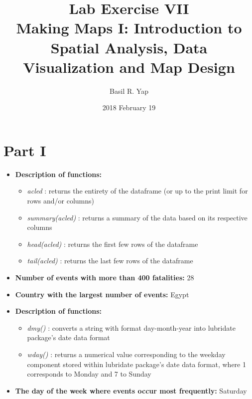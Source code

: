 \documentclass[a4paper, fleqn]{article}
\begin{document}
\title{Lab Exercise VII \\ Making Maps I: Introduction to Spatial Analysis, Data Visualization and Map Design}
\author{Basil R. Yap}
\date{2018 February 19}
\maketitle

\section{Part I}

\begin{itemize}
\item \textbf{Description of functions: }\begin{itemize}
\item \textit{acled} : returns the entirety of the dataframe (or up to the print limit for rows and/or columns)
\item \textit{summary(acled)} : returns a summary of the data based on its respective columns
\item \textit{head(acled)} : returns the first few rows of the dataframe
\item \textit{tail(acled)} : returns the last few rows of the dataframe
\end{itemize}
\item \textbf{Number of events with more than 400 fatalities: }28
\item \textbf{Country with the largest number of events: }Egypt
\item \textbf{Description of functions: }\begin{itemize}
\item \textit{dmy()} : converts a string with format day-month-year into lubridate package's date data format
\item \textit{wday()} : returns a numerical value corresponding to the weekday component stored within lubridate package's date data format, where 1 corresponds to Monday and 7 to Sunday
\end{itemize}
\item \textbf{The day of the week where events occur most frequently: }Saturday
\end{itemize}
\pagebreak
\end{document}
